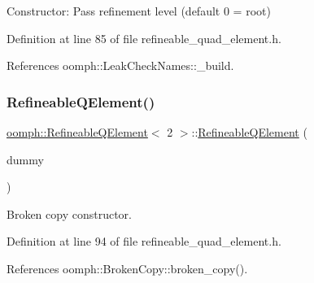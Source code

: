 Constructor\+: Pass refinement level (default 0 = root) 



Definition at line 85 of file refineable\+\_\+quad\+\_\+element.\+h.



References oomph\+::\+Leak\+Check\+Names\+::\+\_\+build.

\mbox{\label{classoomph_1_1RefineableQElement_3_012_01_4_ae9c291e5a937dbe2fbd849604c1c6adb}} 
\subsubsection{\texorpdfstring{Refineable\+Q\+Element()}{RefineableQElement()}\hspace{0.1cm}{\footnotesize\ttfamily [2/2]}}
{\footnotesize\ttfamily \hyperlink{classoomph_1_1RefineableQElement}{oomph\+::\+Refineable\+Q\+Element}$<$ 2 $>$\+::\hyperlink{classoomph_1_1RefineableQElement}{Refineable\+Q\+Element} (\begin{DoxyParamCaption}\item[{const \hyperlink{classoomph_1_1RefineableQElement}{Refineable\+Q\+Element}$<$ 2 $>$ \&}]{dummy }\end{DoxyParamCaption})\hspace{0.3cm}{\ttfamily [inline]}}



Broken copy constructor. 



Definition at line 94 of file refineable\+\_\+quad\+\_\+element.\+h.



References oomph\+::\+Broken\+Copy\+::broken\+\_\+copy().

\mbox{\label{classoomph_1_1RefineableQElement_3_012_01_4_ac2cd2cdd621bff16699a41edc1f5cb1f}} 
